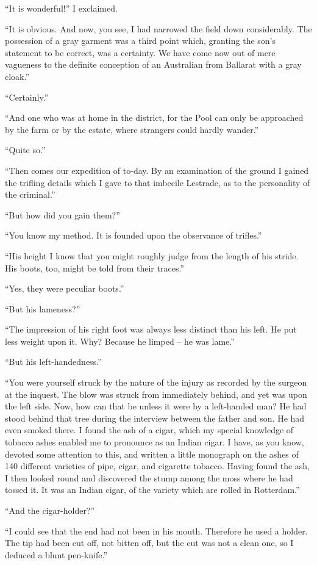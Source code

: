 “It is wonderful!” I exclaimed.

“It is obvious. And now, you see, I had narrowed the field
down considerably. The possession of a gray garment was a
third point which, granting the son’s statement to be correct,
was a certainty. We have come now out of mere vagueness
to the definite conception of an Australian from Ballarat with
a gray cloak.”

“Certainly.”

“And one who was at home in the district, for the Pool
can only be approached by the farm or by the estate, where
strangers could hardly wander.”

“Quite so.”

“Then comes our expedition of to-day. By an examination
of the ground I gained the trifling details which I gave to that
imbecile Lestrade, as to the personality of the criminal.”

“But how did you gain them?”

“You know my method. It is founded upon the observance
of trifles.”

“His height I know that you might roughly judge from the
length of his stride. His boots, too, might be told from their
traces.”

“Yes, they were peculiar boots.”

“But his lameness?”

“The impression of his right foot was always less distinct
than his left. He put less weight upon it. Why? Because
he limped -- he was lame.”

“But his left-handedness.”

“You were yourself struck by the nature of the injury as
recorded by the surgeon at the inquest. The blow was struck
from immediately behind, and yet was upon the left side.
Now, how can that be unless it were by a left-handed man?
He had stood behind that tree during the interview between
the father and son. He had even smoked there. I found the
ash of a cigar, which my special knowledge of tobacco ashes
enabled me to pronounce as an Indian cigar. I have, as you
know, devoted some attention to this, and written a little
monograph on the ashes of 140 different varieties of pipe,
cigar, and cigarette tobacco. Having found the ash, I then
looked round and discovered the stump among the moss
where he had tossed it. It was an Indian cigar, of the variety
which are rolled in Rotterdam.”

“And the cigar-holder?”

“I could see that the end had not been in his mouth.
Therefore he used a holder. The tip had been cut off, not
bitten off, but the cut was not a clean one, so I deduced a
blunt pen-knife.”

